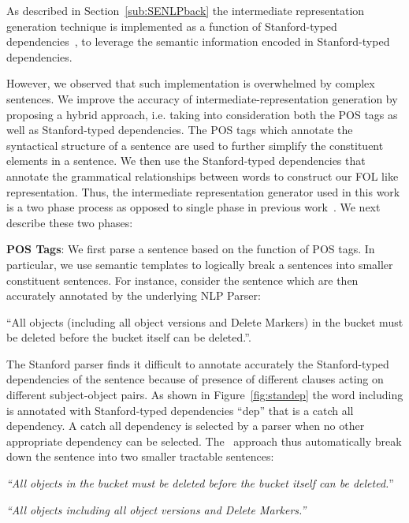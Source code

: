 As described in Section~\ref{sub:SENLPback} the intermediate representation generation technique is implemented as a function of Stanford-typed dependencies~\cite{Marneffe06LREC,Marneffe08COLING,KleinNIPS03}, to leverage the semantic information encoded in Stanford-typed dependencies.


However, we observed that such implementation is overwhelmed by complex sentences.
We improve the accuracy of intermediate-representation generation by proposing a hybrid approach, i.e. taking into consideration both the POS tags as well as Stanford-typed dependencies.
The POS tags which annotate the syntactical structure of a sentence are used to further simplify the constituent elements in a sentence. 
We then use the Stanford-typed dependencies that annotate the grammatical relationships between words to construct our FOL like representation.
Thus, the intermediate representation generator used in this work is a two phase process as opposed to single phase in previous work~\cite{pandita12:inferring, pandita13:WHYPER}. 
We next describe these two phases:

\textbf{POS Tags}: We first parse a sentence based on the function of POS tags. 
In particular, we use semantic templates to logically break a sentences into smaller constituent sentences. 
For instance, consider the sentence which are then accurately annotated by the underlying NLP Parser:

\begin{center}
\scriptsize``All objects (including all object versions and Delete Markers) in the bucket must be deleted before the bucket itself can be deleted.''. \normalsize
\end{center}

The Stanford parser finds it difficult to annotate accurately the Stanford-typed dependencies of the sentence because of presence of different clauses acting on different subject-object pairs.
As shown in Figure~\ref{fig:standep} the word including is annotated with Stanford-typed dependencies ``dep'' that is a catch all dependency. A catch all dependency is selected by a parser when no other appropriate dependency can be selected.
The \tool\ approach thus automatically break down the sentence into two smaller tractable sentences:

\begin{center}
\scriptsize \textit{``All objects in the bucket must be deleted before the bucket itself can be deleted.}''
	
\textit{``All objects including all object versions and Delete Markers.''}\normalsize 
\end{center} 


